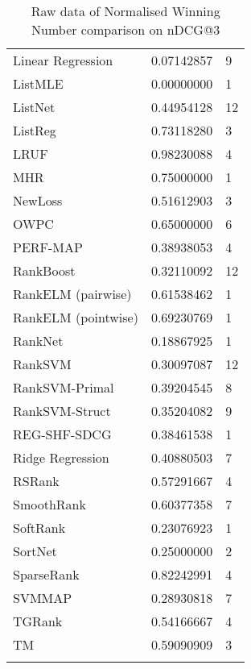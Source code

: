 \begin{longtable}{l|l|l}
Linear Regression & 0.07142857 & 9 \\ 
List\acs{MLE} & 0.00000000 & 1 \\ 
ListNet & 0.44954128 & 12 \\ 
ListReg & 0.73118280 & 3 \\ 
LRUF & 0.98230088 & 4 \\ 
MHR & 0.75000000 & 1 \\ 
NewLoss & 0.51612903 & 3 \\ 
OWPC & 0.65000000 & 6 \\ 
PERF-\acs{MAP} & 0.38938053 & 4 \\ 
RankBoost & 0.32110092 & 12 \\ 
RankELM (pairwise) & 0.61538462 & 1 \\ 
RankELM (pointwise) & 0.69230769 & 1 \\ 
RankNet & 0.18867925 & 1 \\ 
Rank\acs{SVM} & 0.30097087 & 12 \\ 
Rank\acs{SVM}-Primal & 0.39204545 & 8 \\ 
Rank\acs{SVM}-Struct & 0.35204082 & 9 \\ 
REG-SHF-SDCG & 0.38461538 & 1 \\ 
Ridge Regression & 0.40880503 & 7 \\ 
RSRank & 0.57291667 & 4 \\ 
SmoothRank & 0.60377358 & 7 \\ 
SoftRank & 0.23076923 & 1 \\ 
SortNet & 0.25000000 & 2 \\ 
SparseRank & 0.82242991 & 4 \\ 
\acs{SVM}\acs{MAP} & 0.28930818 & 7 \\ 
TGRank & 0.54166667 & 4 \\ 
TM & 0.59090909 & 3 \\
\caption{Raw data of Normalised Winning Number comparison on \acs{nDCG}@3}
\label{tab:raw_data_norm_winnum_ndcg3}
\end{longtable}